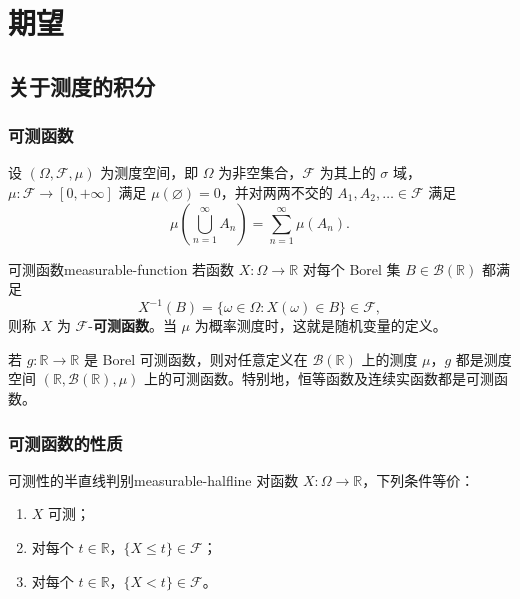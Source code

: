 \chapter{期望}

\section{关于测度的积分}

\subsection*{可测函数}

设 $(\Omega,\mathcal F,\mu)$ 为测度空间，即 $\Omega$ 为非空集合，$\mathcal F$ 为其上的 $\sigma$ 域，$\mu:\mathcal F\to[0,+\infty]$ 满足 $\mu(\varnothing)=0$，并对两两不交的 $A_1,A_2,\ldots\in\mathcal F$ 满足
\[
\mu\left(\bigcup_{n=1}^{\infty}A_n\right)=\sum_{n=1}^{\infty}\mu(A_n).
\]

\begin{mydefinition}{可测函数}{measurable-function}
若函数 $X:\Omega\to\mathbb R$ 对每个 Borel 集 $B\in\mathcal B(\mathbb R)$ 都满足
\[
X^{-1}(B)=\{\omega\in\Omega:X(\omega)\in B\}\in\mathcal F,
\]
则称 $X$ 为 $\mathcal F$-\textbf{可测函数}。当 $\mu$ 为概率测度时，这就是随机变量的定义。
\end{mydefinition}

\begin{example}[实直线上的可测函数]
若 $g:\mathbb R\to\mathbb R$ 是 Borel 可测函数，则对任意定义在 $\mathcal B(\mathbb R)$ 上的测度 $\mu$，$g$ 都是测度空间 $(\mathbb R,\mathcal B(\mathbb R),\mu)$ 上的可测函数。特别地，恒等函数及连续实函数都是可测函数。
\end{example}

\subsection*{可测函数的性质}

\begin{proposition}{可测性的半直线判别}{measurable-halfline}
对函数 $X:\Omega\to\mathbb R$，下列条件等价：
\begin{enumerate}
\item $X$ 可测；
\item 对每个 $t\in\mathbb R$，$\{X\leq t\}\in\mathcal F$；
\item 对每个 $t\in\mathbb R$，$\{X<t\}\in\mathcal F$。
\end{enumerate}
\end{proposition}

